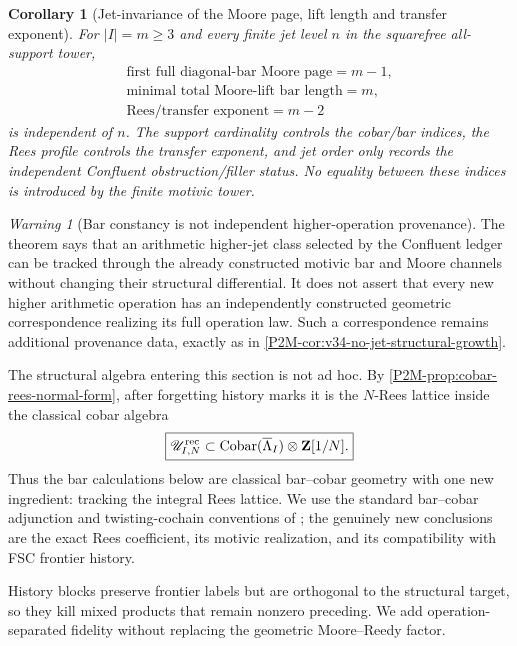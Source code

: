 \documentclass[11pt]{article}
\newtheorem{corollary}[theorem]{Corollary}
\theoremstyle{remark}
\newtheorem{warning}[theorem]{Warning}
\newcommand{\Z}{\mathbf Z}
\newcommand{\Cobar}{\operatorname{Cobar}}
\begin{document}
\begin{corollary}[Jet-invariance of the Moore page, lift length and transfer exponent]
\label{P2M-cor:v36-three-index-jet-invariance}
For $|I|=m\ge3$ and every finite jet level $n$ in the squarefree all-support
tower,
\[
 \boxed{
 \begin{array}{c}
 \text{first full diagonal-bar Moore page}=m-1,\\[1mm]
 \text{minimal total Moore-lift bar length}=m,\\[1mm]
 \text{Rees/transfer exponent}=m-2
 \end{array}}
\]
is independent of $n$.  The support cardinality controls the cobar/bar
indices, the Rees profile controls the transfer exponent, and jet order only
records the independent Confluent obstruction/filler status.  No equality
between these indices is introduced by the finite motivic tower.
\end{corollary}

\begin{warning}[Bar constancy is not independent higher-operation provenance]
\label{P2M-warn:v36-bar-jet-provenance-firewall}
The theorem says that an arithmetic higher-jet class selected by the Confluent
ledger can be tracked through the already constructed motivic bar and Moore
channels without changing their structural differential.  It does not assert
that every new higher arithmetic operation has an independently constructed
geometric correspondence realizing its full operation law.  Such a
correspondence remains additional provenance data, exactly as in
\cref{P2M-cor:v34-no-jet-structural-growth}.
\end{warning}

The structural algebra entering this section is not ad hoc.  By
\cref{P2M-prop:cobar-rees-normal-form}, after forgetting history marks it is the
\(N\)-Rees lattice inside the classical cobar algebra
\[
 \boxed{
 \mathscr U^{\rm rec}_{I,N}
 \subset
 \Cobar(\overline\Lambda_I)\otimes\Z[1/N].}
\]
Thus the bar calculations below are classical bar--cobar geometry with one
new ingredient: tracking the integral Rees lattice.  We use the standard
bar--cobar adjunction and twisting-cochain conventions of
\cite{Adams1956,HMS1974,LodayVallette2012}; the genuinely new conclusions are
the exact Rees coefficient, its motivic realization, and its compatibility
with FSC frontier history.

History blocks preserve frontier labels but are orthogonal to the
structural target, so they kill mixed products that remain nonzero preceding.
We add operation-separated fidelity without replacing the geometric
Moore--Reedy factor.
\end{document}

